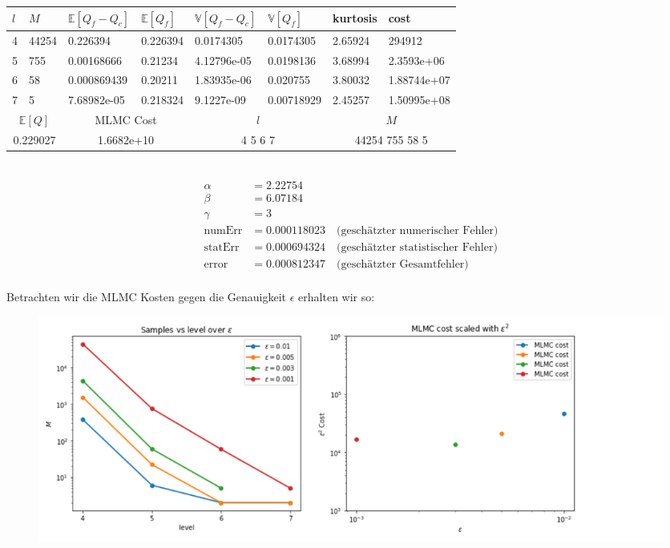 \noindent\begin{tabular}{|p{0.15\q}|p{0.54\q}|p{1.4\q}|p{1.05\q}|p{1.35\q}|p{1.25\q}|p{0.9\q}|p{1.35\q}|}
\hline
$ l $   &  $ M $  &  $ \mathbb{E}[Q_f-Q_c] $  &   $ \mathbb{E}[Q_f] $ &  $ \mathbb{V}[Q_f-Q_c] $   &   $ \mathbb{V}[Q_f] $ &  kurtosis    &    cost\\
\hline
4 & 44254  & 0.226394   &  0.226394 &  0.0174305   &  0.0174305  &   2.65924   &   294912    \\
5 &  755   & 0.00168666 &  0.21234  &  4.12796e-05 &  0.0198136  &   3.68994   &   2.3593e+06\\
6 &   58   & 0.000869439&  0.20211  &  1.83935e-06 &   0.020755  &   3.80032   &   1.88744e+07 \\
7 &    5   & 7.68982e-05&    0.218324&  9.1227e-09&  0.00718929   &  2.45257 &1.50995e+08 \\
\hline 
 \multicolumn{2}{|c|}{$ \mathbb{E}[Q] $ }  &  \multicolumn{2}{c|}{MLMC Cost}   & \multicolumn{2}{c|}{$ l $}  &    \multicolumn{2}{c|}{$ M$} \\
\hline
 \multicolumn{2}{|c|}{0.229027} & \multicolumn{2}{c|}{1.6682e+10  } &  \multicolumn{2}{c|}{  4 5 6 7 }     & \multicolumn{2}{c|}{44254 755 58 5}    \\
\hline 
\end{tabular}\\


\begin{align*}
	\alpha  &=    2.22754   \\
	\beta   &=    6.07184   \\
	\gamma  &=    3   \\
\text{numErr}  &= 0.000118023   \quad \text{(geschätzter numerischer Fehler)}\\
\text{statErr} &= 0.000694324  \quad  \text{(geschätzter statistischer Fehler)}\\
\text{error}   &= 0.000812347  \quad  \text{(geschätzter Gesamtfehler)}\\
\end{align*}

Betrachten wir die MLMC Kosten gegen die Genauigkeit $ \epsilon $ erhalten wir so:
\begin{figure}[H]
	\centering
	\includegraphics[width=\textwidth]{plots/mlmctable.png} 
\end{figure}



